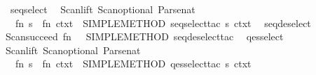 \begin{isabellebody}
\isanewline
{}\isamarkupfalse%
\ seq{}select\ {}\ {}\isanewline
Scan{}lift\ {}Scan{}optional\ Parse{}nat\ {}{}\ {}{}\isanewline
\ \ {}fn\ s\ {}{}\ fn\ ctxt\ {}{}\ SIMPLE{}METHOD\ {}seq{}select{}tac\ s\ ctxt\ {}{}{}\isanewline
{}\isanewline
\isanewline
{}\isamarkupfalse%
\ seq{}deselect\ {}\ {}\isanewline
Scan{}succeed\ {}fn\ {}\ {}{}\ SIMPLE{}METHOD\ {}seq{}deselect{}tac\ {}{}{}\isanewline
{}\isanewline
\isanewline
{}\isamarkupfalse%
\ qes{}select\ {}\ {}\isanewline
Scan{}lift\ {}Scan{}optional\ Parse{}nat\ {}{}\ {}{}\isanewline
\ \ {}fn\ s\ {}{}\ fn\ ctxt\ {}{}\ SIMPLE{}METHOD\ {}qes{}select{}tac\ s\ ctxt\ {}{}{}\isanewline

\end{isabellebody}

